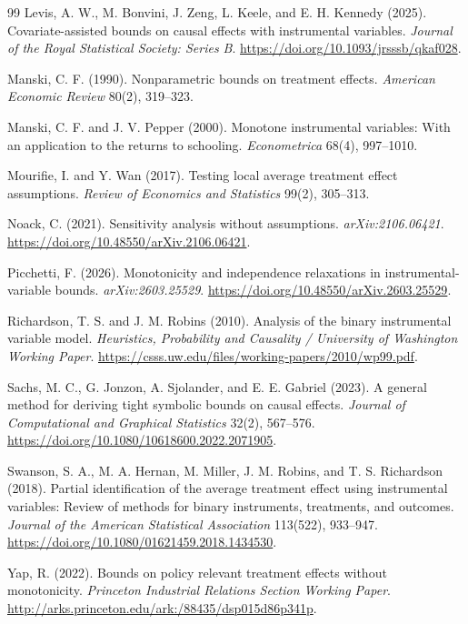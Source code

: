 \documentclass[11pt]{article}
\theoremstyle{definition}
\theoremstyle{plain}
\theoremstyle{remark}
\begin{document}
\begin{thebibliography}{99}
Levis, A. W., M. Bonvini, J. Zeng, L. Keele, and E. H. Kennedy (2025).
Covariate-assisted bounds on causal effects with instrumental variables.
\emph{Journal of the Royal Statistical Society: Series B}.
\url{https://doi.org/10.1093/jrsssb/qkaf028}.

Manski, C. F. (1990).
Nonparametric bounds on treatment effects.
\emph{American Economic Review} 80(2), 319--323.

Manski, C. F. and J. V. Pepper (2000).
Monotone instrumental variables: With an application to the returns to schooling.
\emph{Econometrica} 68(4), 997--1010.

Mourifie, I. and Y. Wan (2017).
Testing local average treatment effect assumptions.
\emph{Review of Economics and Statistics} 99(2), 305--313.

Noack, C. (2021).
Sensitivity analysis without assumptions.
\emph{arXiv:2106.06421}.
\url{https://doi.org/10.48550/arXiv.2106.06421}.

Picchetti, F. (2026).
Monotonicity and independence relaxations in instrumental-variable bounds.
\emph{arXiv:2603.25529}.
\url{https://doi.org/10.48550/arXiv.2603.25529}.

Richardson, T. S. and J. M. Robins (2010).
Analysis of the binary instrumental variable model.
\emph{Heuristics, Probability and Causality / University of Washington Working Paper}.
\url{https://csss.uw.edu/files/working-papers/2010/wp99.pdf}.

Sachs, M. C., G. Jonzon, A. Sjolander, and E. E. Gabriel (2023).
A general method for deriving tight symbolic bounds on causal effects.
\emph{Journal of Computational and Graphical Statistics} 32(2), 567--576.
\url{https://doi.org/10.1080/10618600.2022.2071905}.

Swanson, S. A., M. A. Hernan, M. Miller, J. M. Robins, and T. S. Richardson (2018).
Partial identification of the average treatment effect using instrumental
variables: Review of methods for binary instruments, treatments, and outcomes.
\emph{Journal of the American Statistical Association} 113(522), 933--947.
\url{https://doi.org/10.1080/01621459.2018.1434530}.

Yap, R. (2022).
Bounds on policy relevant treatment effects without monotonicity.
\emph{Princeton Industrial Relations Section Working Paper}.
\url{http://arks.princeton.edu/ark:/88435/dsp015d86p341p}.
\end{thebibliography}
\end{document}
